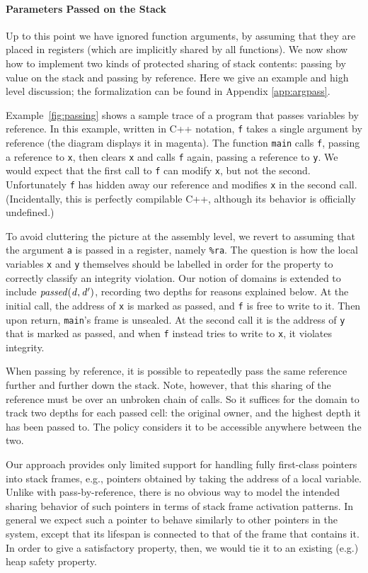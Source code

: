 \documentclass[10pt,conference]{ieeetran}%
\theoremstyle{definition}
\begin{document}
{\medskip
\paragraph*{Parameters Passed on the Stack}
%
Up to this point we have ignored function arguments, by assuming that they are placed
in registers (which are implicitly shared by all functions).
We now show how to implement two kinds of protected
sharing of stack contents: passing by value on the stack and passing by reference.
Here we give an example and high level discussion; the formalization can be found in Appendix \ref{app:argpass}.

Example~\ref{fig:passing} shows a sample trace of a program that passes
variables by reference. In this example, written in C++ notation,
{\tt f} takes a single argument by reference (the diagram displays it in magenta). The function
{\tt main} calls {\tt f}, passing a reference to {\tt x}, then clears {\tt x} and calls
{\tt f} again, passing a reference to {\tt y}.
We would expect that the first call to {\tt f} can modify
{\tt x}, but not the second. Unfortunately {\tt f} has hidden away our reference and modifies
{\tt x} in the second call. (Incidentally, this is perfectly compilable C++,
although its behavior is officially undefined.)

To avoid cluttering the picture at the assembly level, we revert to assuming that the
argument {\tt a} is passed in a register, namely {\tt \%ra}.
The question is how the local variables {\tt x} and {\tt y} themselves
should be labelled in order for the property to correctly classify an integrity violation.
Our notion of domains is extended to include \(\mathit{passed(d,d')}\),
recording two depths for reasons explained below.
At the initial call, the address of {\tt x} is marked as passed, and {\tt f} is free to write to it. Then upon
return, {\tt main}'s frame is unsealed. At the second call it is the address of {\tt y} that is marked as passed,
and when {\tt f} instead tries to write to {\tt x}, it violates integrity.


When passing by reference, it is possible to repeatedly pass the same reference further
and further down the stack. Note, however, that this sharing of the reference must be over
an unbroken chain of calls. So it suffices for the domain to track two depths for each passed
cell: the original owner, and the highest depth it has been passed to. The policy considers
it to be accessible anywhere between the two.

Our approach provides only limited support for handling fully first-class pointers into
stack frames, e.g., pointers obtained by taking the address of a local variable.
Unlike with pass-by-reference, there is no obvious way to model the intended
sharing behavior of such pointers in terms of stack frame activation patterns.
In general we expect such a pointer to behave similarly to other pointers in
the system, except that its lifespan is connected to that of the frame that contains
it. In order to give a satisfactory property, then, we would tie it to an existing (e.g.)
heap safety property.

}
\end{document}
